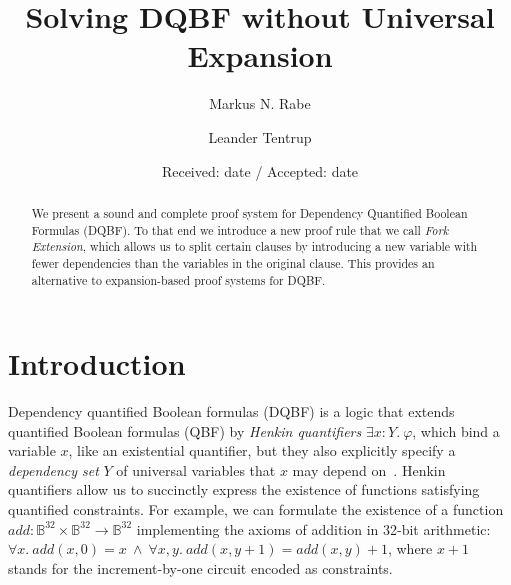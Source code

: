 \documentclass{svjour3}
\title{Solving DQBF without Universal Expansion}%
\author{Markus N. Rabe \and Leander Tentrup}
\institute{Markus N. Rabe \at Google \and Leander Tentrup \at Saarland University}
\date{Received: date / Accepted: date}
\begin{document}
\maketitle

\begin{abstract}
	We present a sound and complete proof system for Dependency Quantified Boolean Formulas (DQBF).
	To that end we introduce a new proof rule that we call \emph{Fork Extension}, which allows us to split certain clauses by introducing a new variable with fewer dependencies than the variables in the original clause.
	This provides an alternative to expansion-based proof systems for DQBF.
\end{abstract}

\section{Introduction}

Dependency quantified Boolean formulas (DQBF) is a logic that extends quantified Boolean formulas (QBF) by \emph{Henkin quantifiers} $\exists x:Y.~\varphi$, which  bind a variable $x$, like an existential quantifier, but they also explicitly specify a \emph{dependency set} $Y$ of universal variables that $x$ may depend on~\cite{PetersonReif/1979/MultiplePersonAlternation,Henkin/1961/SomeRemarksOnInfinitelyLongFormulas}.
Henkin quantifiers allow us to succinctly express the existence of functions satisfying quantified constraints. 
For example, we can formulate the existence of a function $\mathit{add}:\mathbb{B}^{32}\times\mathbb{B}^{32}\to\mathbb{B}^{32}$ implementing the axioms of addition in 32-bit arithmetic: $\forall x.~ \mathit{add}(x,0)=x ~\wedge~ \forall x,y.~ \mathit{add}(x,y+1)=add(x,y)+1$, where $x+1$ stands for the increment-by-one circuit encoded as constraints.
\end{document}
